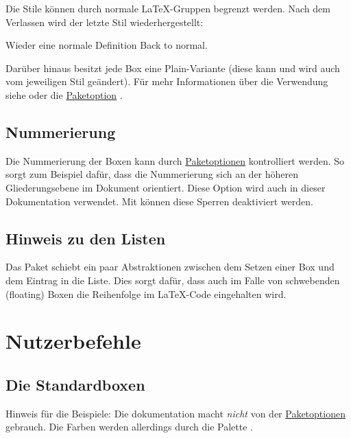\documentclass{article}
\def\say#1{\glqq{}#1\grqq{}}
\def\cmd#1{\texttt{\paletteA{\textbackslash#1}}}
\def\cmdref#1{\hyperref[cmd:#1]{\cmd{#1}}}
\begin{document}
Die Stile können durch normale \LaTeX-Gruppen begrenzt werden. Nach dem Verlassen wird der letzte Stil wiederhergestellt:
\begin{definition}{Wieder eine normale Definition}
    Back to normal.
\end{definition}

Darüber hinaus besitzt jede Box eine \say{Plain}-Variante (diese kann und wird auch vom jeweiligen Stil geändert). Für mehr Informationen über die Verwendung siehe \cmdref{SetBoxPlain} oder die \hyperref[sec:packetoptions]{Paketoption} .

\subsection{Nummerierung}

Die Nummerierung der Boxen kann durch \hyperref[sec:packetoptions]{Paketoptionen} kontrolliert werden. So sorgt  zum Beispiel dafür, dass die Nummerierung sich an der höheren Gliederungsebene im Dokument orientiert.
Diese Option wird auch in dieser Dokumentation verwendet. Mit  können diese Sperren deaktiviert werden.

\subsection{Hinweis zu den Listen}

Das Paket schiebt ein paar Abstraktionen zwischen dem Setzen einer Box und dem Eintrag in die Liste. Dies sorgt dafür, dass auch im Falle von \say{schwebenden} (floating) Boxen die Reihenfolge im \LaTeX-Code eingehalten wird.

\section{Nutzerbefehle}

\subsection{Die Standardboxen}

Hinweis für die Beispiele: Die dokumentation macht \emph{nicht} von der \hyperref[sec:packetoptions]{Paketoptionen}  gebrauch. Die Farben werden allerdings durch die Palette \say{\CurrentPalette}.
\end{document}
